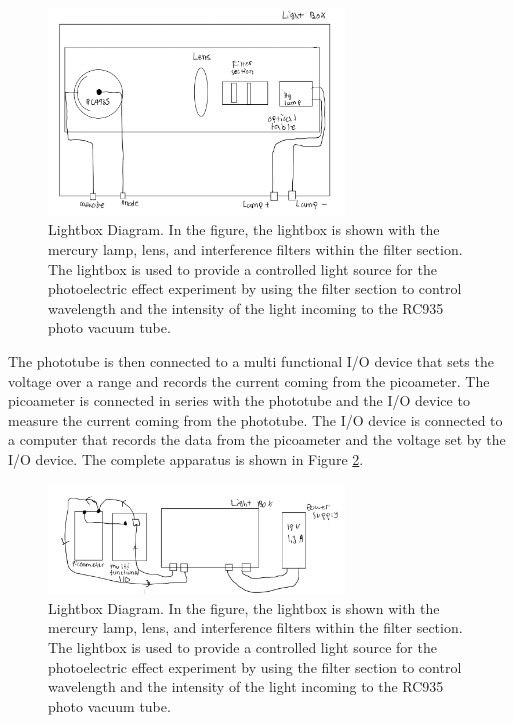 \documentclass[12pt]{article}
\begin{document}
        \begin{figure}[!h]
                \centering
                \includegraphics[width=0.7\textwidth]{../imgs/lightbox.png}
                \caption{Lightbox Diagram. In the figure, the lightbox is shown with the mercury lamp, lens, and interference filters within the filter section.
                 The lightbox is used to provide a controlled light source for the photoelectric effect experiment by using the filter section to control wavelength and the intensity of the light incoming to the RC935 photo vacuum tube.}
                \label{fig: Lightbox Diagram}
        \end{figure}

        The phototube is then connected to a multi functional I/O device that sets the voltage over a range and records the 
        current coming from the picoameter. The picoameter is connected in series with the phototube and the I/O device to 
        measure the current coming from the phototube. The I/O device is connected to a computer that records the data from
        the picoameter and the voltage set by the I/O device. The complete apparatus is shown in Figure \ref{fig: Apparatus Diagram}.

        \newpage

        \begin{figure}[!h]
                \centering
                \includegraphics[width=0.7\textwidth]{../imgs/apparatus.png}
                \caption{Lightbox Diagram. In the figure, the lightbox is shown with the mercury lamp, lens, and interference filters within the filter section.
                 The lightbox is used to provide a controlled light source for the photoelectric effect experiment by using the filter section to control wavelength and the intensity of the light incoming to the RC935 photo vacuum tube.}
                \label{fig: Apparatus Diagram}
        \end{figure}
\end{document}

